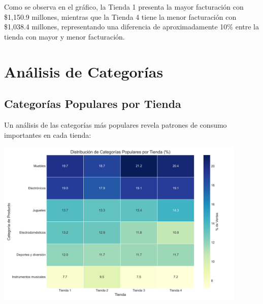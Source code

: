 \documentclass[12pt,a4paper]{report}\usepackage[spanish]{babel}\usepackage[utf8]{inputenc}\usepackage{graphicx}\usepackage{geometry}\usepackage{xcolor}\usepackage{tikz}\usepackage{pgfplots}\usepackage{booktabs}\usepackage{multicol}\usepackage{hyperref}\usepackage{pgf-pie}
\begin{document}
Como se observa en el gráfico, la Tienda 1 presenta la mayor facturación con \$1,150.9 millones, mientras que la Tienda 4 tiene la menor facturación con \$1,038.4 millones, representando una diferencia de aproximadamente 10\% entre la tienda con mayor y menor facturación.

\chapter{Análisis de Categorías}

\section{Categorías Populares por Tienda}

Un análisis de las categorías más populares revela patrones de consumo importantes en cada tienda:

\begin{center}
\includegraphics[width=0.9\textwidth]{2_categorias_populares_global.png}
\end{center}
\end{document}
